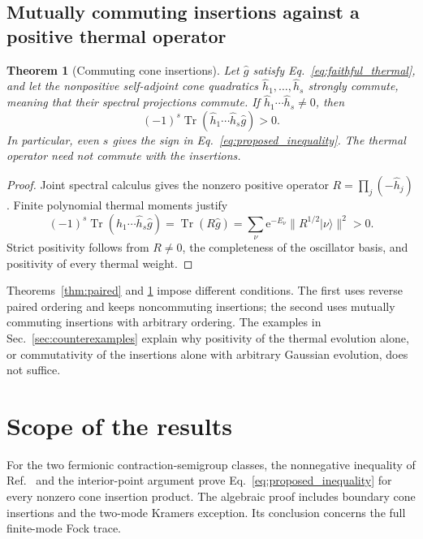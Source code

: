 \documentclass[11pt,a4paper]{article}
\newcommand{\Tr}{\operatorname{Tr}}
\newcommand{\ee}{\mathrm e}
\newtheorem{theorem}{Theorem}
\theoremstyle{remark}
\numberwithin{equation}{section}
\begin{document}
\subsection{Mutually commuting insertions against a positive thermal operator}

\begin{theorem}[Commuting cone insertions]
\label{thm:commuting}
Let \(\hat g\) satisfy Eq.~\eqref{eq:faithful_thermal}, and let the
nonpositive self-adjoint cone quadratics \(\hat h_1,\ldots,\hat h_s\)
strongly commute, meaning that their spectral projections commute. If
\(\hat h_1\cdots\hat h_s\ne0\), then
\begin{equation}
\boxed{(-1)^s\Tr(\hat h_1\cdots\hat h_s\hat g)>0.}
\label{eq:commuting_positive}
\end{equation}
In particular, even \(s\) gives the sign in
Eq.~\eqref{eq:proposed_inequality}. The thermal operator need not commute
with the insertions.
\end{theorem}

\begin{proof}
Joint spectral calculus gives the nonzero positive operator
\(R=\prod_j(-\hat h_j)\). Finite polynomial thermal moments justify
\begin{equation}
(-1)^s\Tr(\hat h_1\cdots\hat h_s\hat g)
=\Tr(R\hat g)
=\sum_\nu\ee^{-E_\nu}\|R^{1/2}|\nu\rangle\|^2>0.
\end{equation}
Strict positivity follows from \(R\ne0\), the completeness of the
oscillator basis, and positivity of every thermal weight.
\end{proof}

Theorems~\ref{thm:paired} and \ref{thm:commuting} impose different
conditions. The first uses reverse paired ordering and keeps noncommuting
insertions; the second uses mutually commuting insertions with arbitrary
ordering. The examples in Sec.~\ref{sec:counterexamples} explain why
positivity of the thermal evolution alone, or commutativity of the
insertions alone with arbitrary Gaussian evolution, does not suffice.

\section{Scope of the results}

For the two fermionic contraction-semigroup classes, the nonnegative
inequality of Ref.~\cite{wei2024prb} and the interior-point argument prove
Eq.~\eqref{eq:proposed_inequality} for every nonzero cone insertion product.
The algebraic proof includes boundary cone insertions and the two-mode
Kramers exception. Its conclusion concerns the full finite-mode Fock trace.
\end{document}
